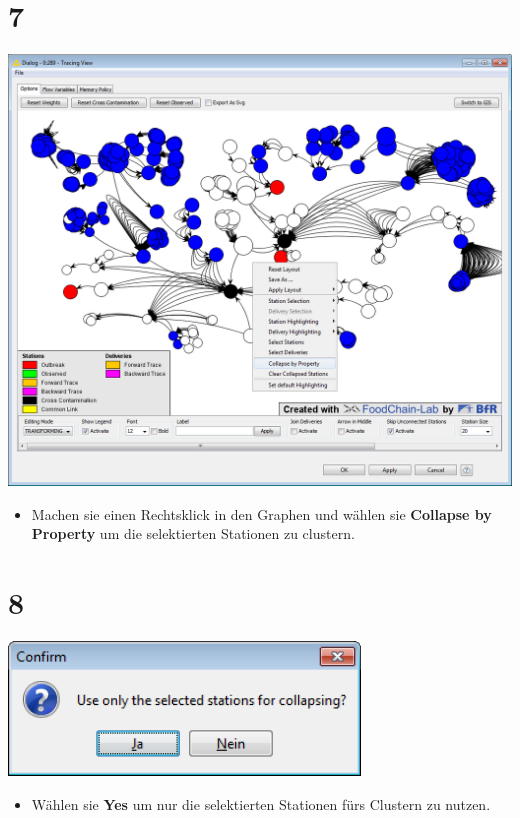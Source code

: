 \documentclass{beamer}
\begin{document}
\section{7}
\begin{frame}
	\begin{center}
  		\includegraphics[height=0.6\textheight]{7.png}
	\end{center}
	\begin{itemize}
		\item Machen sie einen Rechtsklick in den Graphen und wählen sie \textbf{Collapse by Property} um die selektierten Stationen zu clustern.
	\end{itemize}
\end{frame}

\section{8}
\begin{frame}
	\begin{center}
  		\includegraphics[width=0.7\textwidth]{8.png}
	\end{center}
	\begin{itemize}
		\item Wählen sie \textbf{Yes} um nur die selektierten Stationen fürs Clustern zu nutzen.
	\end{itemize}
\end{frame}
\end{document}
